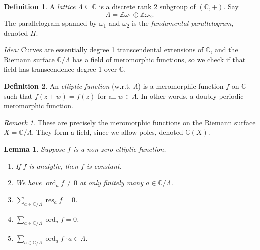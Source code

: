\documentclass[a4paper]{article}
\theoremstyle{plain}
\newtheorem{lemma}[theorem]{Lemma}
\theoremstyle{remark}
\newtheorem*{remark}{Remark}
\theoremstyle{definition}
\newtheorem*{definition}{Definition}
\DeclareMathOperator{\ord}{ord}
\DeclareMathOperator{\res}{res}
\newcommand{\Z}{\mathbb{Z}}
\newcommand{\C}{\mathbb{C}}
\begin{document}
\begin{definition}
    A \emph{lattice} $\Lambda\subseteq\C$ is a discrete rank 2 subgroup of
    $(\C,+)$. Say
    \begin{equation*}
        \Lambda = \Z\omega_1\oplus\Z\omega_2.
    \end{equation*}
    The parallelogram spanned by $\omega_1$ and $\omega_2$ is the
    \emph{fundamental parallelogram}, denoted $\Pi$.
\end{definition}

\textit{Idea:} Curves are essentially degree 1 transcendental extensions of
$\C$, and the Riemann surface $\C/\Lambda$ has a field of meromorphic functions,
so we check if that field has transcendence degree 1 over $\C$.

\begin{definition}
    An \emph{elliptic function} (w.r.t. $\Lambda$) is a meromorphic function $f$
    on $\C$ such that $f(z+w)=f(z)$ for all $w\in\Lambda$. In other words, a
    doubly-periodic meromorphic function.
\end{definition}

\begin{remark}
    These are precisely the meromorphic functions on the Riemann surface
    $X=\C/\Lambda$. They form a field, since we allow poles, denoted $\C(X)$.
\end{remark}

\begin{lemma}
    Suppose $f$ is a non-zero elliptic function.
    \begin{enumerate}[label=(\roman*)]
        \item If $f$ is analytic, then $f$ is constant.
        \item We have $\ord_af\ne0$ at only finitely many $a\in\C/\Lambda$.
        \item $\sum_{a\in\C/\Lambda}\res_af=0$.
        \item $\sum_{a\in\C/\Lambda}\ord_af=0$.
        \item $\sum_{a\in\C/\Lambda}\ord_af\cdot a\in\Lambda$.
    \end{enumerate}
\end{lemma}
\end{document}

